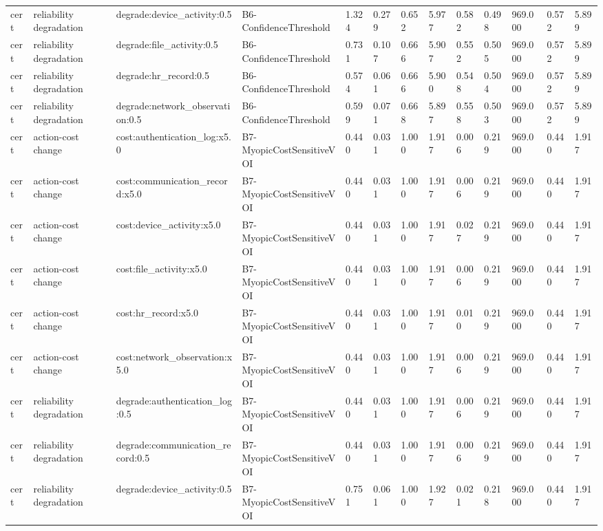 \begin{table}[!ht]
{\begin{tabular}{lllllllllllll}
cert & reliability degradation & degrade:device\_activity:0.5 & B6-ConfidenceThreshold & 1.324 & 0.279 & 0.652 & 5.977 & 0.582 & 0.498 & 969.000 & 0.572 & 5.899 \\
cert & reliability degradation & degrade:file\_activity:0.5 & B6-ConfidenceThreshold & 0.731 & 0.107 & 0.666 & 5.907 & 0.552 & 0.505 & 969.000 & 0.572 & 5.899 \\
cert & reliability degradation & degrade:hr\_record:0.5 & B6-ConfidenceThreshold & 0.574 & 0.061 & 0.666 & 5.900 & 0.548 & 0.504 & 969.000 & 0.572 & 5.899 \\
cert & reliability degradation & degrade:network\_observation:0.5 & B6-ConfidenceThreshold & 0.599 & 0.071 & 0.668 & 5.897 & 0.558 & 0.503 & 969.000 & 0.572 & 5.899 \\
cert & action-cost change & cost:authentication\_log:x5.0 & B7-MyopicCostSensitiveVOI & 0.440 & 0.031 & 1.000 & 1.917 & 0.006 & 0.219 & 969.000 & 0.440 & 1.917 \\
cert & action-cost change & cost:communication\_record:x5.0 & B7-MyopicCostSensitiveVOI & 0.440 & 0.031 & 1.000 & 1.917 & 0.006 & 0.219 & 969.000 & 0.440 & 1.917 \\
cert & action-cost change & cost:device\_activity:x5.0 & B7-MyopicCostSensitiveVOI & 0.440 & 0.031 & 1.000 & 1.917 & 0.027 & 0.219 & 969.000 & 0.440 & 1.917 \\
cert & action-cost change & cost:file\_activity:x5.0 & B7-MyopicCostSensitiveVOI & 0.440 & 0.031 & 1.000 & 1.917 & 0.006 & 0.219 & 969.000 & 0.440 & 1.917 \\
cert & action-cost change & cost:hr\_record:x5.0 & B7-MyopicCostSensitiveVOI & 0.440 & 0.031 & 1.000 & 1.917 & 0.010 & 0.219 & 969.000 & 0.440 & 1.917 \\
cert & action-cost change & cost:network\_observation:x5.0 & B7-MyopicCostSensitiveVOI & 0.440 & 0.031 & 1.000 & 1.917 & 0.006 & 0.219 & 969.000 & 0.440 & 1.917 \\
cert & reliability degradation & degrade:authentication\_log:0.5 & B7-MyopicCostSensitiveVOI & 0.440 & 0.031 & 1.000 & 1.917 & 0.006 & 0.219 & 969.000 & 0.440 & 1.917 \\
cert & reliability degradation & degrade:communication\_record:0.5 & B7-MyopicCostSensitiveVOI & 0.440 & 0.031 & 1.000 & 1.917 & 0.006 & 0.219 & 969.000 & 0.440 & 1.917 \\
cert & reliability degradation & degrade:device\_activity:0.5 & B7-MyopicCostSensitiveVOI & 0.751 & 0.061 & 1.000 & 1.927 & 0.021 & 0.218 & 969.000 & 0.440 & 1.917 \\

\end{tabular}}
\end{table}

